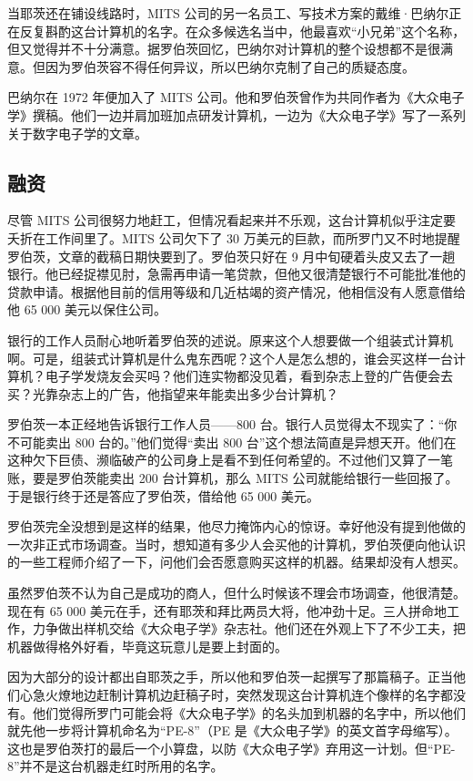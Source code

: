 \documentclass[12pt,UTF8]{ctexbook}
\begin{document}
当耶茨还在铺设线路时，MITS 公司的另一名员工、写技术方案的戴维·巴纳尔正在反复斟酌这台计算机的名字。在众多候选名当中，他最喜欢“小兄弟”这个名称，但又觉得并不十分满意。据罗伯茨回忆，巴纳尔对计算机的整个设想都不是很满意。但因为罗伯茨容不得任何异议，所以巴纳尔克制了自己的质疑态度。

巴纳尔在 1972 年便加入了 MITS 公司。他和罗伯茨曾作为共同作者为《大众电子学》撰稿。他们一边并肩加班加点研发计算机，一边为《大众电子学》写了一系列关于数字电子学的文章。





\subsection{融资}


尽管 MITS 公司很努力地赶工，但情况看起来并不乐观，这台计算机似乎注定要夭折在工作间里了。MITS 公司欠下了 30 万美元的巨款，而所罗门又不时地提醒罗伯茨，文章的截稿日期快要到了。罗伯茨只好在 9 月中旬硬着头皮又去了一趟银行。他已经捉襟见肘，急需再申请一笔贷款，但他又很清楚银行不可能批准他的贷款申请。根据他目前的信用等级和几近枯竭的资产情况，他相信没有人愿意借给他 65 000 美元以保住公司。

银行的工作人员耐心地听着罗伯茨的述说。原来这个人想要做一个组装式计算机啊。可是，组装式计算机是什么鬼东西呢？这个人是怎么想的，谁会买这样一台计算机？电子学发烧友会买吗？他们连实物都没见着，看到杂志上登的广告便会去买？光靠杂志上的广告，他指望来年能卖出多少台计算机？

罗伯茨一本正经地告诉银行工作人员——800 台。银行人员觉得太不现实了：“你不可能卖出 800 台的。”他们觉得“卖出 800 台”这个想法简直是异想天开。他们在这种欠下巨债、濒临破产的公司身上是看不到任何希望的。不过他们又算了一笔账，要是罗伯茨能卖出 200 台计算机，那么 MITS 公司就能给银行一些回报了。于是银行终于还是答应了罗伯茨，借给他 65 000 美元。

罗伯茨完全没想到是这样的结果，他尽力掩饰内心的惊讶。幸好他没有提到他做的一次非正式市场调查。当时，想知道有多少人会买他的计算机，罗伯茨便向他认识的一些工程师介绍了一下，问他们会否愿意购买这样的机器。结果却没有人想买。

虽然罗伯茨不认为自己是成功的商人，但什么时候该不理会市场调查，他很清楚。现在有 65 000 美元在手，还有耶茨和拜比两员大将，他冲劲十足。三人拼命地工作，力争做出样机交给《大众电子学》杂志社。他们还在外观上下了不少工夫，把机器做得格外好看，毕竟这玩意儿是要上封面的。

因为大部分的设计都出自耶茨之手，所以他和罗伯茨一起撰写了那篇稿子。正当他们心急火燎地边赶制计算机边赶稿子时，突然发现这台计算机连个像样的名字都没有。他们觉得所罗门可能会将《大众电子学》的名头加到机器的名字中，所以他们就先他一步将计算机命名为“PE-8”（PE 是《大众电子学》的英文首字母缩写）。这也是罗伯茨打的最后一个小算盘，以防《大众电子学》弃用这一计划。但“PE-8”并不是这台机器走红时所用的名字。
\end{document}
